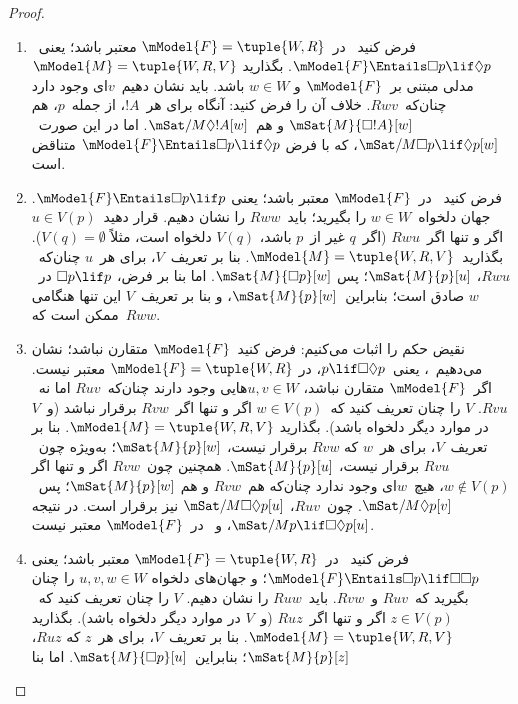 \documentclass[../../../include/open-logic-section]{subfiles}
\begin{document}
\begin{proof}
  \begin{enumerate}
  \item فرض کنید~ در~$\mModel{F} = \tuple{W, R}$ معتبر باشد؛
    یعنی~$\mModel{F} \Entails \Box p \lif \Diamond p$. بگذارید
    $\mModel{M} = \tuple{W, R, V}$ مدلی مبتنی بر~$\mModel{F}$ و
    $w \in W$ باشد. باید نشان دهیم~$v$ای وجود دارد چنان‌که~$Rwv$.
    خلاف آن را فرض کنید: آنگاه برای هر~$!A$، از جمله~$p$، هم
    $\mSat{M}{\Box !A}[w]$ و هم~$\mSat/{M}{\Diamond !A}[w]$. اما در
    این صورت~$\mSat/{M}{\Box p \lif \Diamond p}[w]$، که با فرض
    $\mModel{F} \Entails \Box p \lif \Diamond p$ متناقض است.
  \item فرض کنید~ در~$\mModel{F}$ معتبر باشد؛ یعنی
    $\mModel{F} \Entails \Box p \lif p$. جهان دلخواه~$w \in W$ را
    بگیرید؛ باید~$Rww$ را نشان دهیم. قرار دهید~$u \in V(p)$ اگر و تنها
    اگر~$Rwu$ (اگر~$q$ غیر از~$p$ باشد، $V(q)$ دلخواه است، مثلاً
    $V(q) = \emptyset$). بگذارید~$\mModel{M} = \tuple{W, R, V}$. بنا
    بر تعریف~$V$، برای هر~$u$ چنان‌که~$Rwu$، $\mSat{M}{p}[u]$؛ پس
    $\mSat{M}{\Box p}[w]$. اما بنا بر فرض، $\Box p \lif p$ در~$w$
    صادق است؛ بنابراین~$\mSat{M}{p}[w]$، و بنا بر تعریف~$V$ این تنها
    هنگامی ممکن است که~$Rww$.
  \item نقیض حکم را اثبات می‌کنیم: فرض کنید~$\mModel{F}$ متقارن نباشد؛
    نشان می‌دهیم~، یعنی~$p \lif \Box\Diamond p$، در
    $\mModel{F}= \tuple{W, R}$ معتبر نیست. اگر~$\mModel{F}$ متقارن
    نباشد، $u,v \in W$هایی وجود دارند چنان‌که~$Ruv$ اما نه~$Rvu$.
    $V$ را چنان تعریف کنید که~$w \in V(p)$ اگر و تنها اگر~$Rvw$
    برقرار نباشد (و~$V$ در موارد دیگر دلخواه باشد). بگذارید
    $\mModel{M} =\tuple{W, R,V}$. بنا بر تعریف~$V$، برای هر~$w$ که
    $Rvw$ برقرار نیست، $\mSat{M}{p}[w]$؛ به‌ویژه چون~$Rvu$ برقرار
    نیست، $\mSat{M}{p}[u]$. همچنین چون~$Rvw$ اگر و تنها اگر
    $w \notin V(p)$، هیچ~$w$ای وجود ندارد چنان‌که هم~$Rvw$ و هم
    $\mSat{M}{p}[w]$؛ پس~$\mSat/{M}{\Diamond p}[v]$. چون~$Ruv$،
    $\mSat/{M}{\Box\Diamond p}[u]$ نیز برقرار است. در نتیجه
    $\mSat/{M}{p \lif \Box\Diamond p}[u]$، و~ در~$\mModel{F}$
    معتبر نیست.
  \item فرض کنید~ در~$\mModel{F} = \tuple{W,R}$ معتبر باشد؛ یعنی
    $\mModel{F} \Entails \Box p \lif \Box\Box p$؛ و جهان‌های دلخواه
    $u,v,w \in W$ را چنان بگیرید که~$Ruv$ و~$Rvw$. باید~$Ruw$ را نشان
    دهیم. $V$ را چنان تعریف کنید که~$z \in V(p)$ اگر و تنها اگر~$Ruz$
    (و~$V$ در موارد دیگر دلخواه باشد). بگذارید
    $\mModel{M} =\tuple{W, R,V}$. بنا بر تعریف~$V$، برای هر~$z$ که
    $Ruz$، $\mSat{M}{p}[z]$؛ بنابراین~$\mSat{M}{\Box p}[u]$. اما بنا

\end{enumerate}
\end{proof}
\end{document}
